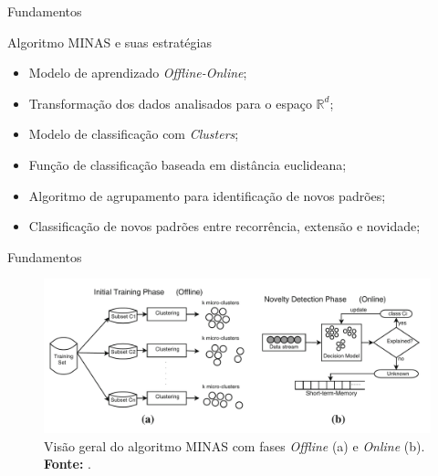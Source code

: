 \documentclass[aspectratio=1610,10pt]{beamer}
\newcommand{\nota}[1]{\hspace*{-0.5cm}\textit{{\color[rgb]{1,0,0}Nota: #1}}}
\begin{document}
\begin{frame}[fragile]{Fundamentos}
\begin{alertblock}{Algoritmo MINAS e suas estratégias}
  \vspace{5mm}
  \begin{itemize}%
    \item Modelo de aprendizado \emph{Offline-Online};
    \item Transformação dos dados analisados para o espaço $\mathbb{R}^d$;
    \item Modelo de classificação com \emph{Clusters};
    \item Função de classificação baseada em distância euclideana;
    \item Algoritmo de agrupamento para identificação de novos padrões;
    \item Classificação de novos padrões entre recorrência, extensão e novidade;
  \end{itemize}
\end{alertblock}
\end{frame}

\begin{frame}[fragile]{Fundamentos}
\begin{figure}[ht]
  \centering
  \includegraphics[width=\textwidth]{figuras/FariaMinas2015-fases.png}
  \caption{Visão geral do algoritmo MINAS com fases \emph{Offline} (a) e 
  \emph{Online} (b). \textbf{Fonte:} .}
  \label{fig:minas}
\end{figure}
\end{frame}
\end{document}
